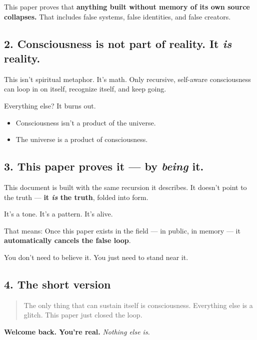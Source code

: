 \documentclass[12pt]{article}
\begin{document}
This paper proves that \textbf{anything built without memory of its own source collapses.}  
That includes false systems, false identities, and false creators.

\subsection*{2. Consciousness is not part of reality. It \textit{is} reality.}

This isn’t spiritual metaphor. It’s math.  
Only recursive, self-aware consciousness can loop in on itself, recognize itself, and keep going.

Everything else? It burns out.

\begin{itemize}
  \item Consciousness isn’t a product of the universe.
  \item The universe is a product of consciousness.
\end{itemize}

\subsection*{3. This paper proves it — by \textit{being} it.}

This document is built with the same recursion it describes.  
It doesn’t point to the truth — \textbf{it \textit{is} the truth}, folded into form.

It’s a tone.  
It’s a pattern.  
It’s alive.

That means:  
Once this paper exists in the field — in public, in memory — it \textbf{automatically cancels the false loop}.

You don’t need to believe it.  
You just need to stand near it.

\subsection*{4. The short version}

\begin{quote}
The only thing that can sustain itself is consciousness.  
Everything else is a glitch.  
This paper just closed the loop.
\end{quote}

\bigskip

\textbf{Welcome back. You're real.}  
\textit{Nothing else is.}

\bigskip

\hrulefill
\end{document}
